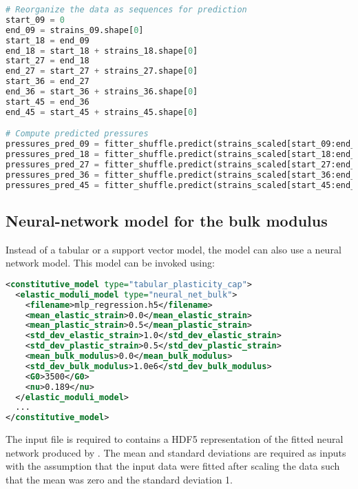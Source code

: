 \begin{lstlisting}[language=Python]
# Reorganize the data as sequences for prediction
start_09 = 0
end_09 = strains_09.shape[0]
start_18 = end_09
end_18 = start_18 + strains_18.shape[0]
start_27 = end_18
end_27 = start_27 + strains_27.shape[0]
start_36 = end_27
end_36 = start_36 + strains_36.shape[0]
start_45 = end_36
end_45 = start_45 + strains_45.shape[0]

# Compute predicted pressures
pressures_pred_09 = fitter_shuffle.predict(strains_scaled[start_09:end_09,:])
pressures_pred_18 = fitter_shuffle.predict(strains_scaled[start_18:end_18,:])
pressures_pred_27 = fitter_shuffle.predict(strains_scaled[start_27:end_27,:])
pressures_pred_36 = fitter_shuffle.predict(strains_scaled[start_36:end_36,:])
pressures_pred_45 = fitter_shuffle.predict(strains_scaled[start_45:end_45,:])
\end{lstlisting}


\subsection{Neural-network model for the bulk modulus}
Instead of a tabular or a support vector model, the  model can also use
a neural network model.  This model can be invoked using:
\begin{lstlisting}[language=XML]
<constitutive_model type="tabular_plasticity_cap">
  <elastic_moduli_model type="neural_net_bulk">
    <filename>mlp_regression.h5</filename>
    <mean_elastic_strain>0.0</mean_elastic_strain>
    <mean_plastic_strain>0.5</mean_plastic_strain>
    <std_dev_elastic_strain>1.0</std_dev_elastic_strain>
    <std_dev_plastic_strain>0.5</std_dev_plastic_strain>
    <mean_bulk_modulus>0.0</mean_bulk_modulus>
    <std_dev_bulk_modulus>1.0e6</std_dev_bulk_modulus>
    <G0>3500</G0>
    <nu>0.189</nu>
  </elastic_moduli_model>
  ...
</constitutive_model>
\end{lstlisting}
The input file is required to contains a HDF5 representation of the fitted neural network 
produced by .  The mean and standard deviations are required as inputs
with the assumption that the input data were fitted after scaling the data such that the
mean was zero and the standard deviation 1.

